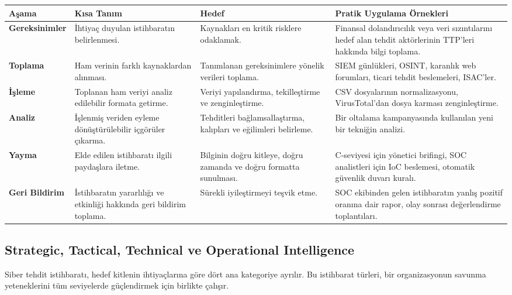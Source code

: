 \begin{tabularx}{\textwidth}{|l|X|X|X|}
\hline
\textbf{Aşama} & \textbf{Kısa Tanım} & \textbf{Hedef} & \textbf{Pratik Uygulama Örnekleri} \\
\hline
\textbf{Gereksinimler} & İhtiyaç duyulan istihbaratın belirlenmesi. & Kaynakları en kritik risklere odaklamak. & Finansal dolandırıcılık veya veri sızıntılarını hedef alan tehdit aktörlerinin TTP'leri hakkında bilgi toplama. \\
\hline
\textbf{Toplama} & Ham verinin farklı kaynaklardan alınması. & Tanımlanan gereksinimlere yönelik verileri toplama. & SIEM günlükleri, OSINT, karanlık web forumları, ticari tehdit beslemeleri, ISAC'ler. \\
\hline
\textbf{İşleme} & Toplanan ham veriyi analiz edilebilir formata getirme. & Veriyi yapılandırma, tekilleştirme ve zenginleştirme. & CSV dosyalarının normalizasyonu, VirusTotal'dan dosya karması zenginleştirme. \\
\hline
\textbf{Analiz} & İşlenmiş veriden eyleme dönüştürülebilir içgörüler çıkarma. & Tehditleri bağlamsallaştırma, kalıpları ve eğilimleri belirleme. & Bir oltalama kampanyasında kullanılan yeni bir tekniğin analizi. \\
\hline
\textbf{Yayma} & Elde edilen istihbaratı ilgili paydaşlara iletme. & Bilginin doğru kitleye, doğru zamanda ve doğru formatta sunulması. & C-seviyesi için yönetici brifingi, SOC analistleri için IoC beslemesi, otomatik güvenlik duvarı kuralı. \\
\hline
\textbf{Geri Bildirim} & İstihbaratın yararlılığı ve etkinliği hakkında geri bildirim toplama. & Sürekli iyileştirmeyi teşvik etme. & SOC ekibinden gelen istihbaratın yanlış pozitif oranına dair rapor, olay sonrası değerlendirme toplantıları. \\
\hline
\end{tabularx}

\subsection{Strategic, Tactical, Technical ve Operational Intelligence}

Siber tehdit istihbaratı, hedef kitlenin ihtiyaçlarına göre dört ana kategoriye ayrılır. Bu istihbarat türleri, bir organizasyonun savunma yeteneklerini tüm seviyelerde güçlendirmek için birlikte çalışır.

